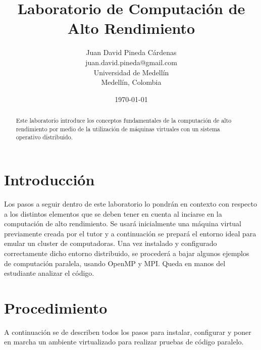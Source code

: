 \documentclass[12pt]{article}
\title{Laboratorio de Computación de Alto Rendimiento}
\author{
        Juan David Pineda Cárdenas \\
        juan.david.pineda@gmail.com\\
        Universidad de Medellín\\
        Medellín, Colombia
}
\date{\today}
\begin{document}
\maketitle

\begin{abstract}
Este laboratorio introduce los conceptos fundamentales de la computación de alto rendimiento por medio de la utilización de máquinas virtuales con un sistema operativo distribuido.
\end{abstract}

\section{Introducción}
Los pasos a seguir dentro de este laboratorio lo pondrán en contexto con respecto a los distintos elementos que se deben tener en cuenta al inciarse en la computación de alto rendimiento. Se usará inicialmente una máquina virtual previamente creada por el tutor y a continuación se prepará el entorno ideal para emular un cluster de computadoras. Una vez instalado y configurado correctamente dicho entorno distribuido, se procederá a bajar algunos ejemplos de computación paralela, usando OpenMP y MPI. Queda en manos del estudiante analizar el código.

\section{Procedimiento}
A continuación se de describen todos los pasos para instalar, configurar y poner en marcha un ambiente virtualizado para realizar pruebas de código paralelo.
\end{document}
